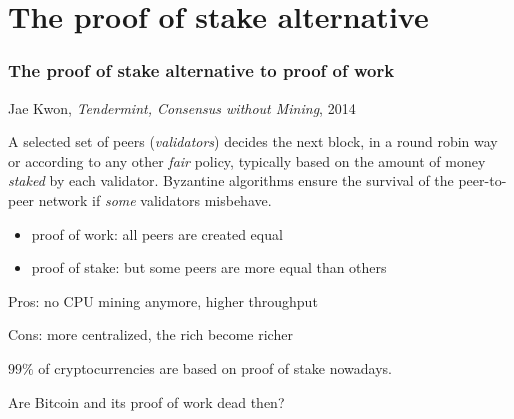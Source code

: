 \documentclass[11pt]{beamer}  %
\begin{document}
\section{The proof of stake alternative}

\begin{frame}\frametitle{The proof of stake alternative to proof of work}

  \begin{center}
    Jae Kwon, \emph{Tendermint, Consensus without Mining}, 2014
  \end{center}

  \begin{greenbox}{}
    A selected set of peers (\emph{validators}) decides the next block, in
    a round robin way or according to any other \emph{fair} policy, typically
    based on the amount of money \emph{staked} by each validator.
    Byzantine algorithms ensure the survival of the peer-to-peer network if
    \emph{some} validators misbehave.

    \begin{itemize}
    \item proof of work: all peers are created equal
    \item proof of stake: but some peers are more equal than others
    \end{itemize}
  \end{greenbox}

  \medskip

  \pause

  \begin{center}
    Pros: no CPU mining anymore, higher throughput
  \end{center}

  \begin{center}
    Cons: more centralized, the rich become richer
  \end{center}

  \medskip

  \begin{center}
    $99\%$ of cryptocurrencies are based on proof of stake nowadays.
  \end{center}

  \pause

  \begin{center}
    \alert{Are Bitcoin and its proof of work dead then?}
  \end{center}

\end{frame}
\end{document}

